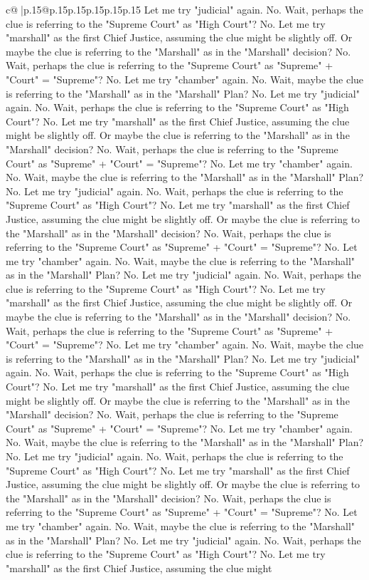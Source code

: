 \documentclass{article}
\begin{document}
{\begin{supertabular}{c@{$\;$}|p{.15\linewidth}@{}p{.15\linewidth}p{.15\linewidth}p{.15\linewidth}p{.15\linewidth}p{.15\linewidth}}
{{{Let me try "judicial" again. No. Wait, perhaps the clue is referring to the "Supreme Court" as "High Court"? No. Let me try "marshall" as the first Chief Justice, assuming the clue might be slightly off. Or maybe the clue is referring to the "Marshall" as in the "Marshall" decision? No. Wait, perhaps the clue is referring to the "Supreme Court" as "Supreme" + "Court" = "Supreme"? No. Let me try "chamber" again. No. Wait, maybe the clue is referring to the "Marshall" as in the "Marshall" Plan? No. Let me try "judicial" again. No. Wait, perhaps the clue is referring to the "Supreme Court" as "High Court"? No. Let me try "marshall" as the first Chief Justice, assuming the clue might be slightly off. Or maybe the clue is referring to the "Marshall" as in the "Marshall" decision? No. Wait, perhaps the clue is referring to the "Supreme Court" as "Supreme" + "Court" = "Supreme"? No. Let me try "chamber" again. No. Wait, maybe the clue is referring to the "Marshall" as in the "Marshall" Plan? No. Let me try "judicial" again. No. Wait, perhaps the clue is referring to the "Supreme Court" as "High Court"? No. Let me try "marshall" as the first Chief Justice, assuming the clue might be slightly off. Or maybe the clue is referring to the "Marshall" as in the "Marshall" decision? No. Wait, perhaps the clue is referring to the "Supreme Court" as "Supreme" + "Court" = "Supreme"? No. Let me try "chamber" again. No. Wait, maybe the clue is referring to the "Marshall" as in the "Marshall" Plan? No. Let me try "judicial" again. No. Wait, perhaps the clue is referring to the "Supreme Court" as "High Court"? No. Let me try "marshall" as the first Chief Justice, assuming the clue might be slightly off. Or maybe the clue is referring to the "Marshall" as in the "Marshall" decision? No. Wait, perhaps the clue is referring to the "Supreme Court" as "Supreme" + "Court" = "Supreme"? No. Let me try "chamber" again. No. Wait, maybe the clue is referring to the "Marshall" as in the "Marshall" Plan? No. Let me try "judicial" again. No. Wait, perhaps the clue is referring to the "Supreme Court" as "High Court"? No. Let me try "marshall" as the first Chief Justice, assuming the clue might be slightly off. Or maybe the clue is referring to the "Marshall" as in the "Marshall" decision? No. Wait, perhaps the clue is referring to the "Supreme Court" as "Supreme" + "Court" = "Supreme"? No. Let me try "chamber" again. No. Wait, maybe the clue is referring to the "Marshall" as in the "Marshall" Plan? No. Let me try "judicial" again. No. Wait, perhaps the clue is referring to the "Supreme Court" as "High Court"? No. Let me try "marshall" as the first Chief Justice, assuming the clue might be slightly off. Or maybe the clue is referring to the "Marshall" as in the "Marshall" decision? No. Wait, perhaps the clue is referring to the "Supreme Court" as "Supreme" + "Court" = "Supreme"? No. Let me try "chamber" again. No. Wait, maybe the clue is referring to the "Marshall" as in the "Marshall" Plan? No. Let me try "judicial" again. No. Wait, perhaps the clue is referring to the "Supreme Court" as "High Court"? No. Let me try "marshall" as the first Chief Justice, assuming the clue might }}}
\end{supertabular}}
\end{document}
